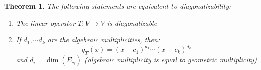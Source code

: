 \documentclass[10pt,letterpaper]{article} %
\newtheorem{thm}{Theorem}[section]
\begin{document}
\begin{thm}
The following statements are equivalent to diagonalizability:
\begin{enumerate}
\item The linear operator $T: V \xrightarrow{} V$ is diagonalizable
\item If $d_1, \cdots d_k$ are the algebraic multiplicities, then:
\begin{equation*}
q_T(x) = (x - c_1)^{d_1} \cdots (x - c_k)^{d_k}
\end{equation*}
and $d_i = \dim(E_{c_i})$ (algebraic multiplicity is equal to geometric multiplicity)
\end{enumerate}
\end{thm}
\end{document}
